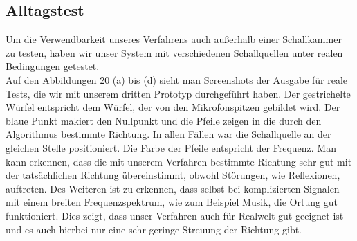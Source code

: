 \subsection{Alltagstest}
Um die Verwendbarkeit unseres Verfahrens auch außerhalb einer Schallkammer zu testen, haben wir unser System mit verschiedenen Schallquellen unter realen Bedingungen getestet.\\
Auf den Abbildungen 20 (a) bis (d) sieht man Screenshots der Ausgabe für reale Tests, die wir mit unserem dritten Prototyp durchgeführt haben. Der gestrichelte Würfel entspricht dem Würfel, der von den Mikrofonspitzen gebildet wird. Der blaue Punkt makiert den Nullpunkt und die Pfeile zeigen in die durch den Algorithmus bestimmte Richtung. In allen Fällen war die Schallquelle an der gleichen Stelle positioniert. Die Farbe der Pfeile entspricht der Frequenz. Man kann erkennen, dass die mit unserem Verfahren bestimmte Richtung sehr gut mit der tatsächlichen Richtung übereinstimmt, obwohl Störungen, wie Reflexionen, auftreten. Des Weiteren ist zu erkennen, dass selbst bei komplizierten Signalen mit einem breiten Frequenzspektrum, wie zum Beispiel Musik, die Ortung gut funktioniert. Dies zeigt, dass unser Verfahren auch für Realwelt gut geeignet ist und es auch hierbei nur eine sehr geringe Streuung der Richtung gibt.
